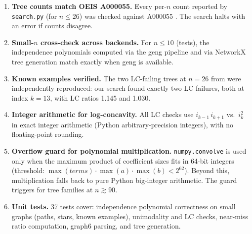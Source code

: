 \documentclass[12pt,oneside]{article}
\theoremstyle{remark}
\begin{document}
\begin{enumerate}
  \item \textbf{Tree counts match OEIS A000055.}
    Every per-$n$ count reported by \texttt{search.py} (for $n \le 26$) was checked against A000055 \citep{oeis-a000055}.
    The search halts with an error if counts disagree.

  \item \textbf{Small-$n$ cross-check across backends.}
    For $n \le 10$ (tests), the independence polynomials computed via the geng pipeline and via NetworkX tree generation match exactly when geng is available.

  \item \textbf{Known examples verified.}
    The two LC-failing trees at $n = 26$ from \citet{kadrawi2023} were independently reproduced: our search found exactly two LC failures, both at index $k = 13$, with LC ratios 1.145 and 1.030.

  \item \textbf{Integer arithmetic for log-concavity.}
    All LC checks use $i_{k-1}\, i_{k+1}$ vs.\ $i_k^2$ in exact integer arithmetic (Python arbitrary-precision integers), with no floating-point rounding.

  \item \textbf{Overflow guard for polynomial multiplication.}
    \texttt{numpy.convolve} is used only when the maximum product of coefficient sizes fits in 64-bit integers (threshold: $\max(\mathit{terms}) \cdot \max(a) \cdot \max(b) < 2^{62}$).
    Beyond this, multiplication falls back to pure Python big-integer arithmetic.
    The guard triggers for tree families at $n \gtrsim 90$.

  \item \textbf{Unit tests.}
    37 tests cover: independence polynomial correctness on small graphs (paths, stars, known examples), unimodality and LC checks, near-miss ratio computation, graph6 parsing, and tree generation.
\end{enumerate}

\newpage
\printbibliography
\end{document}
